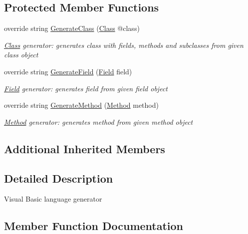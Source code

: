 \subsection*{Protected Member Functions}
\begin{DoxyCompactItemize}
\item 
override string \mbox{\hyperlink{classCodeGen_1_1generators_1_1VbGenerator_a78dd1bac9e915e214bb6a43b3ebc15b5}{Generate\+Class}} (\mbox{\hyperlink{classCodeGen_1_1generators_1_1Class}{Class}} @class)
\begin{DoxyCompactList}\small\item\em \mbox{\hyperlink{classCodeGen_1_1generators_1_1Class}{Class}} generator\+: generates class with fields, methods and subclasses from given class object  \end{DoxyCompactList}\item 
override string \mbox{\hyperlink{classCodeGen_1_1generators_1_1VbGenerator_a114f5fcd8cc13180701041b6d9815f3f}{Generate\+Field}} (\mbox{\hyperlink{classCodeGen_1_1generators_1_1Field}{Field}} field)
\begin{DoxyCompactList}\small\item\em \mbox{\hyperlink{classCodeGen_1_1generators_1_1Field}{Field}} generator\+: generates field from given field object  \end{DoxyCompactList}\item 
override string \mbox{\hyperlink{classCodeGen_1_1generators_1_1VbGenerator_ab8855feff4b8292c04a53362d270b34d}{Generate\+Method}} (\mbox{\hyperlink{classCodeGen_1_1generators_1_1Method}{Method}} method)
\begin{DoxyCompactList}\small\item\em \mbox{\hyperlink{classCodeGen_1_1generators_1_1Method}{Method}} generator\+: generates method from given method object  \end{DoxyCompactList}\end{DoxyCompactItemize}
\subsection*{Additional Inherited Members}


\subsection{Detailed Description}
Visual Basic language generator 



\subsection{Member Function Documentation}
\mbox{\label{classCodeGen_1_1generators_1_1VbGenerator_a78dd1bac9e915e214bb6a43b3ebc15b5}} 

